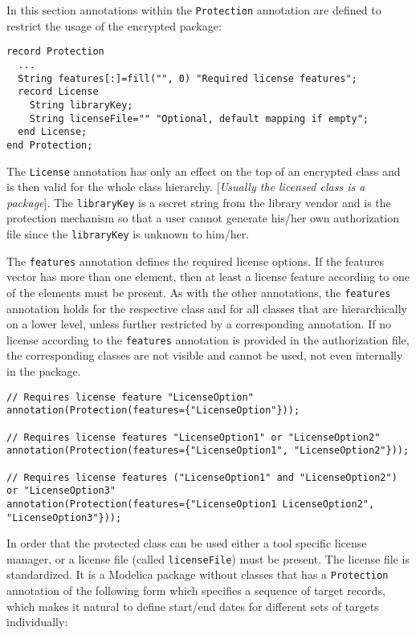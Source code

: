 In this section annotations within the \lstinline!Protection! annotation are
defined to restrict the usage of the encrypted package:

\begin{lstlisting}[language=modelica]
record Protection
  ...
  String features[:]=fill("", 0) "Required license features";
  record License
    String libraryKey;
    String licenseFile="" "Optional, default mapping if empty";
  end License;
end Protection;
\end{lstlisting}
The \lstinline!License! annotation has only an effect on the top of an encrypted
class and is then valid for the whole class hierarchy. {[}\emph{Usually
the licensed class is a package}{]}. The \lstinline!libraryKey! is a secret string
from the library vendor and is the protection mechanism so that a user
cannot generate his/her own authorization file since the \lstinline!libraryKey! is
unknown to him/her.

The \lstinline!features! annotation defines the required license options. If the
features vector has more than one element, then at least a license
feature according to one of the elements must be present. As with the
other annotations, the \lstinline!features! annotation holds for the respective
class and for all classes that are hierarchically on a lower level,
unless further restricted by a corresponding annotation. If no license
according to the \lstinline!features! annotation is provided in the
authorization file, the corresponding classes are not visible and cannot
be used, not even internally in the package.

\begin{example}
\begin{lstlisting}[language=modelica]
// Requires license feature "LicenseOption"
annotation(Protection(features={"LicenseOption"}));

// Requires license features "LicenseOption1" or "LicenseOption2"
annotation(Protection(features={"LicenseOption1", "LicenseOption2"}));

// Requires license features ("LicenseOption1" and "LicenseOption2") or "LicenseOption3"
annotation(Protection(features={"LicenseOption1 LicenseOption2", "LicenseOption3"}));
\end{lstlisting}
\end{example}

In order that the protected class can be used either a tool specific
license manager, or a license file (called \lstinline!licenseFile!) must be
present. The license file is standardized. It is a Modelica package
without classes that has a \lstinline!Protection! annotation of the following form
which specifies a sequence of target records, which makes it natural to
define start/end dates for different sets of targets individually:

